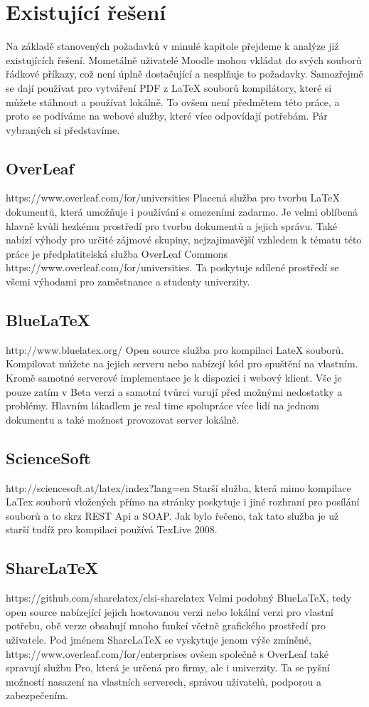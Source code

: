 \section{Existující řešení}
Na základě stanovených požadavků v minulé kapitole přejdeme k analýze již existujících řešení. Mometálně uživatelé Moodle mohou vkládat do svých souborů řádkové příkazy, což není úplně dostačující a nesplňuje to požadavky. Samozřejmě se dají používat pro vytváření PDF z LaTeX souborů kompilátory, které si můžete stáhnout a používat lokálně. To ovšem není předmětem této práce, a proto se podíváme na webové služby, které více odpovídají potřebám. Pár vybraných si představíme.  

\subsection{OverLeaf}
https://www.overleaf.com/for/universities
Placená služba pro tvorbu LaTeX dokumentů, která umožňuje i používání s omezeními zadarmo. Je velmi oblíbená hlavně kvůli hezkému prostředí pro tvorbu dokumentů a jejich správu. Také nabízí výhody pro určité zájmové skupiny, nejzajimavější vzhledem k tématu této práce je předplatitelská služba OverLeaf Commons https://www.overleaf.com/for/universities. Ta poskytuje sdílené prostředí se všemi výhodami pro zaměstnance a studenty univerzity.

\subsection{BlueLaTeX}
http://www.bluelatex.org/
Open source služba pro kompilaci LateX souborů. Kompilovat můžete na jejich serveru nebo nabízejí kód pro spuštění na vlastním. Kromě samotné serverové implementace je k dispozici i webový klient. Vše je pouze zatím v Beta verzi a samotní tvůrci varují před možnými nedostatky a problémy. Hlavním lákadlem je real time spolupráce více lidí na jednom dokumentu a také možnost provozovat server lokálně. 

\subsection{ScienceSoft}
http://sciencesoft.at/latex/index?lang=en
Starší služba, která mimo kompilace LaTex souborů vložených přímo na stránky poskytuje i jiné rozhraní pro posílání souborů a to skrz REST Api a SOAP. Jak bylo řečeno, tak tato služba je už starší tudíž pro kompilaci používá TexLive 2008.

\subsection{ShareLaTeX}
https://github.com/sharelatex/clsi-sharelatex
Velmi podobný BlueLaTeX, tedy open source nabízející jejich hostovanou verzi nebo lokální verzi pro vlastní potřebu, obě verze obsahují mnoho funkcí včetně grafického prostředí pro uživatele. Pod jménem ShareLaTeX se vyskytuje jenom výše zmíněné, https://www.overleaf.com/for/enterprises ovšem společně s OverLeaf také spravují službu Pro, která je určená pro firmy, ale i univerzity. Ta se pyšní možností nasazení na vlastních serverech, správou uživatelů, podporou a zabezpečením.

